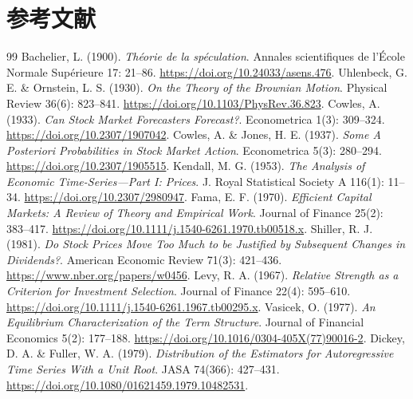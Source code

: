 \section*{参考文献}
\begin{thebibliography}{99}
\small
{} Bachelier, L. (1900). \emph{Théorie de la spéculation}. Annales scientifiques de l'École Normale Supérieure 17: 21--86. \href{https://doi.org/10.24033/asens.476}{https://doi.org/10.24033/asens.476}.
 Uhlenbeck, G. E. \& Ornstein, L. S. (1930). \emph{On the Theory of the Brownian Motion}. Physical Review 36(6): 823--841. \href{https://doi.org/10.1103/PhysRev.36.823}{https://doi.org/10.1103/PhysRev.36.823}.
 Cowles, A. (1933). \emph{Can Stock Market Forecasters Forecast?}. Econometrica 1(3): 309--324. \href{https://doi.org/10.2307/1907042}{https://doi.org/10.2307/1907042}.
 Cowles, A. \& Jones, H. E. (1937). \emph{Some A Posteriori Probabilities in Stock Market Action}. Econometrica 5(3): 280--294. \href{https://doi.org/10.2307/1905515}{https://doi.org/10.2307/1905515}.
 Kendall, M. G. (1953). \emph{The Analysis of Economic Time-Series---Part I: Prices}. J. Royal Statistical Society A 116(1): 11--34. \href{https://doi.org/10.2307/2980947}{https://doi.org/10.2307/2980947}.
 Fama, E. F. (1970). \emph{Efficient Capital Markets: A Review of Theory and Empirical Work}. Journal of Finance 25(2): 383--417. \href{https://doi.org/10.1111/j.1540-6261.1970.tb00518.x}{https://doi.org/10.1111/j.1540-6261.1970.tb00518.x}.
 Shiller, R. J. (1981). \emph{Do Stock Prices Move Too Much to be Justified by Subsequent Changes in Dividends?}. American Economic Review 71(3): 421--436. \href{https://www.nber.org/papers/w0456}{https://www.nber.org/papers/w0456}.
 Levy, R. A. (1967). \emph{Relative Strength as a Criterion for Investment Selection}. Journal of Finance 22(4): 595--610. \href{https://doi.org/10.1111/j.1540-6261.1967.tb00295.x}{https://doi.org/10.1111/j.1540-6261.1967.tb00295.x}.
 Vasicek, O. (1977). \emph{An Equilibrium Characterization of the Term Structure}. Journal of Financial Economics 5(2): 177--188. \href{https://doi.org/10.1016/0304-405X(77)90016-2}{https://doi.org/10.1016/0304-405X(77)90016-2}.
 Dickey, D. A. \& Fuller, W. A. (1979). \emph{Distribution of the Estimators for Autoregressive Time Series With a Unit Root}. JASA 74(366): 427--431. \href{https://doi.org/10.1080/01621459.1979.10482531}{https://doi.org/10.1080/01621459.1979.10482531}.

\end{thebibliography}
